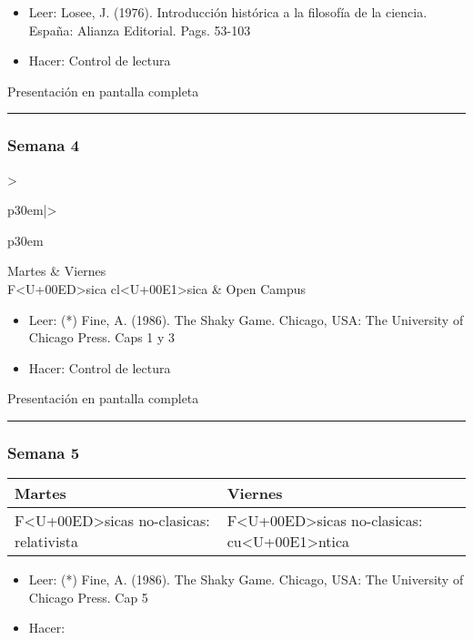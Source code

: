 \documentclass[spanish,]{article}
\begin{document}
\begin{itemize}
\item
  Leer: Losee, J. (1976). Introducción histórica a la filosofía de la
  ciencia. España: Alianza Editorial. Pags. 53-103
\item
  Hacer: Control de lectura
\end{itemize}

Presentación en pantalla completa

\begin{center}\rule{0.5\linewidth}{\linethickness}\end{center}

\subsubsection{Semana 4}\label{semana-4}

\begin{tabular}{>{\raggedright\arraybackslash}p{30em}|>{\raggedright\arraybackslash}p{30em}}
\hline
Martes & Viernes\\
\hline
F<U+00ED>sica cl<U+00E1>sica & Open Campus\\
\hline
\end{tabular}

\begin{itemize}
\item
  Leer: (*) Fine, A. (1986). The Shaky Game. Chicago, USA: The
  University of Chicago Press. Caps 1 y 3
\item
  Hacer: Control de lectura
\end{itemize}

Presentación en pantalla completa

\begin{center}\rule{0.5\linewidth}{\linethickness}\end{center}

\subsubsection{Semana 5}\label{semana-5}

\begin{tabular}{>{\raggedright\arraybackslash}p{30em}|>{\raggedright\arraybackslash}p{30em}}
\hline
Martes & Viernes\\
\hline
F<U+00ED>sicas no-clasicas: relativista & F<U+00ED>sicas no-clasicas: cu<U+00E1>ntica\\
\hline
\end{tabular}

\begin{itemize}
\item
  Leer: (*) Fine, A. (1986). The Shaky Game. Chicago, USA: The
  University of Chicago Press. Cap 5
\item
  Hacer:
\end{itemize}
\end{document}
